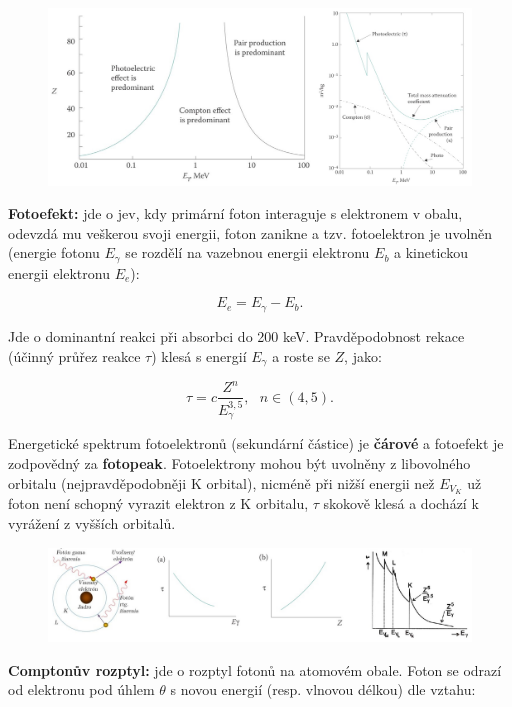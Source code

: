 \begin{figure}[H]
    \centering
    \includegraphics[width=1\textwidth]{img/interakce.JPG}
\end{figure}

\textbf{Fotoefekt:} jde o jev, kdy primární foton interaguje s elektronem v obalu, odevzdá mu veškerou svoji energii, foton zanikne a tzv. fotoelektron je uvolněn (energie fotonu $E_\gamma$ se rozdělí na vazebnou energii elektronu $E_b$ a kinetickou energii elektronu $E_e$):

$$ E_e = E_\gamma - E_b. $$

Jde o dominantní reakci při absorbci do 200 keV. Pravděpodobnost rekace (účinný průřez reakce $\tau$) klesá s energií $E_\gamma$ a roste se $Z$, jako:

$$ \tau = c \dfrac{Z^n}{E_\gamma^{3,5}}, \: \: \: n \in (4,5). $$

Energetické spektrum fotoelektronů (sekundární částice) je \textbf{čárové} a fotoefekt je zodpovědný za \textbf{fotopeak}. Fotoelektrony mohou být uvolněny z libovolného orbitalu (nejpravděpodobněji K orbital), nicméně při nižší energii než $E_{V_K}$ už foton není schopný vyrazit elektron z K orbitalu, $\tau$ skokově klesá a dochází k vyrážení z vyšších orbitalů.

\begin{figure}[H]
    \centering
    \includegraphics[width=1\textwidth]{img/fotoefekt.JPG}
\end{figure}

\textbf{Comptonův rozptyl:} jde o rozptyl fotonů na atomovém obale. Foton se odrazí od elektronu pod úhlem $\theta$ s novou energií (resp. vlnovou délkou) dle vztahu:

